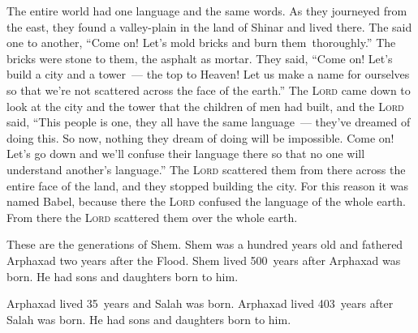 
\begin{inparaenum}
     The entire world had one language and the same words.%
     As they journeyed from the east, they found a valley-plain in the land of Shinar and lived there.%
     The said one to another, ``Come on! Let's mold bricks and burn them\understood\ thoroughly.'' The bricks were stone to them, the asphalt as mortar.%
     They said, ``Come on! Let's build a city and a tower~--- the top to Heaven! Let us make a name for ourselves so that we're not scattered across the face of the earth.''%
     The \textsc{Lord} came down to look at the city and the tower that the children of men had built,%
     and the \textsc{Lord} said, ``This people is one, they all have the same language~--- they've dreamed of doing this. So now, nothing they dream of doing will be impossible.%
     Come on! Let's go down and we'll confuse their language there so that no one will understand another's language.''%
     The \textsc{Lord} scattered them from there across the entire face of the land, and they stopped building the city.%
     For this reason it was named Babel, because there the \textsc{Lord} confused the language of the whole earth. From there the \textsc{Lord} scattered them over the whole earth.%
    
     These are the generations of Shem. Shem was a hundred years old and fathered Arphaxad two years after the Flood.%
     Shem lived 500~years after Arphaxad was born. He had sons and daughters born to him.%
    
     Arphaxad lived 35~years and Salah was born.%
     Arphaxad lived 403~years after Salah was born. He had sons and daughters born to him.%
    

\end{inparaenum}
